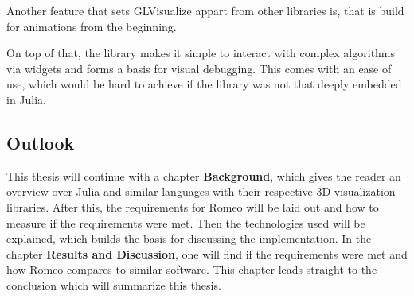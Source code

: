 Another feature that sets GLVisualize appart from other libraries is, that is build for animations from the beginning.

On top of that, the library makes it simple to interact with complex algorithms via widgets and forms a basis for visual debugging. 
This comes with an ease of use, which would be hard to achieve if the library was not that deeply embedded in Julia.


\subsection{Outlook}
This thesis will continue with a chapter \textbf{Background}, which gives the reader an overview over Julia and similar languages with their respective 3D visualization libraries.
After this, the requirements for Romeo will be laid out and how to measure if the requirements were met.
Then the technologies used will be explained, which builds the basis for discussing the implementation.
In the chapter \textbf{Results and Discussion}, one will find if the requirements were met and how Romeo compares to similar software.
This chapter leads straight to the conclusion which will summarize this thesis.
